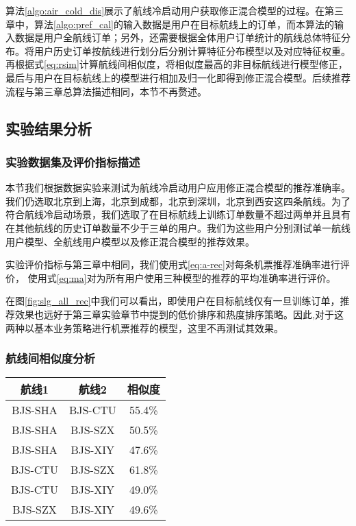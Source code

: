算法\ref{algo:air_cold_dis}展示了航线冷启动用户获取修正混合模型的过程。在第三章中，算法\ref{algo:pref_cal}的输入数据是用户在目标航线上的订单，而本算法的输入数据是用户全航线订单；另外，还需要根据全体用户订单统计的航线总体特征分布。将用户历史订单按航线进行划分后分别计算特征分布模型以及对应特征权重。再根据式\ref{eq:rsim}计算航线间相似度，将相似度最高的非目标航线进行模型修正，最后与用户在目标航线上的模型进行相加及归一化即得到修正混合模型。后续推荐流程与第三章总算法描述相同，本节不再赘述。

\subsection{实验结果分析}

\subsubsection{实验数据集及评价指标描述}

本节我们根据数据实验来测试为航线冷启动用户应用修正混合模型的推荐准确率。
我们仍选取北京到上海，北京到成都，北京到深圳，北京到西安这四条航线。为了符合航线冷启动场景，我们选取了在目标航线上训练订单数量不超过两单并且具有在其他航线的历史订单数量不少于三单的用户。我们为这些用户分别测试单一航线用户模型、全航线用户模型以及修正混合模型的推荐效果。

实验评价指标与第三章中相同，我们使用式\ref{eq:a-rec}对每条机票推荐准确率进行评价，
使用式\ref{eq:ma}对为所有用户使用三种模型的推荐的平均准确率进行评价。

在图\ref{fig:slg_all_rec}中我们可以看出，即使用户在目标航线仅有一旦训练订单，推荐效果也远好于第三章实验章节中提到的低价排序和热度排序策略。因此,对于这两种以基本业务策略进行机票推荐的模型，这里不再测试其效果。

\subsubsection{航线间相似度分析}

\begin{table}[!hpb]
  \centering
  \begin{tabular}{|c|c|c|} \hline 
    航线1& 航线2 & 相似度\\ \hline
    BJS-SHA & BJS-CTU & 55.4\% \\ \hline
    BJS-SHA & BJS-SZX & 50.5\% \\ \hline
    BJS-SHA & BJS-XIY & 47.6\% \\ \hline
    BJS-CTU & BJS-SZX & 61.8\% \\ \hline
    BJS-CTU & BJS-XIY & 49.0\% \\ \hline
    BJS-SZX & BJS-XIY & 49.6\% \\ \hline
  \end{tabular}
\end{table}

